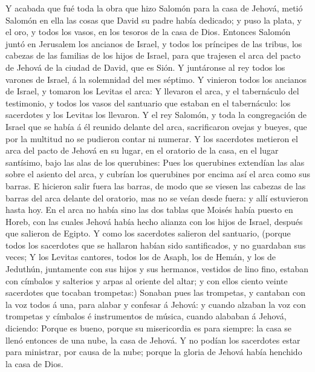  Y acabada que fué toda la obra que hizo Salomón para la
casa de Jehová, metió Salomón en ella las cosas que David su padre había
dedicado; y puso la plata, y el oro, y todos los vasos, en los tesoros
de la casa de Dios.  Entonces Salomón juntó en Jerusalem
los ancianos de Israel, y todos los príncipes de las tribus, los cabezas
de las familias de los hijos de Israel, para que trajesen el arca del
pacto de Jehová de la ciudad de David, que es Sión.  Y
juntáronse al rey todos los varones de Israel, á la solemnidad del mes
séptimo.  Y vinieron todos los ancianos de Israel, y
tomaron los Levitas el arca:  Y llevaron el arca, y el
tabernáculo del testimonio, y todos los vasos del santuario que estaban
en el tabernáculo: los sacerdotes y los Levitas los llevaron.
 Y el rey Salomón, y toda la congregación de Israel que se
había á él reunido delante del arca, sacrificaron ovejas y bueyes, que
por la multitud no se pudieron contar ni numerar.  Y los
sacerdotes metieron el arca del pacto de Jehová en su lugar, en el
oratorio de la casa, en el lugar santísimo, bajo las alas de los
querubines:  Pues los querubines extendían las alas sobre
el asiento del arca, y cubrían los querubines por encima así el arca
como sus barras.  E hicieron salir fuera las barras, de
modo que se viesen las cabezas de las barras del arca delante del
oratorio, mas no se veían desde fuera: y allí estuvieron hasta hoy.
 En el arca no había sino las dos tablas que Moisés había
puesto en Horeb, con las cuales Jehová había hecho alianza con los hijos
de Israel, después que salieron de Egipto.  Y como los
sacerdotes salieron del santuario, (porque todos los sacerdotes que se
hallaron habían sido santificados, y no guardaban sus veces;
 Y los Levitas cantores, todos los de Asaph, los de
Hemán, y los de Jeduthún, juntamente con sus hijos y sus hermanos,
vestidos de lino fino, estaban con címbalos y salterios y arpas al
oriente del altar; y con ellos ciento veinte sacerdotes que tocaban
trompetas:)  Sonaban pues las trompetas, y cantaban con
la voz todos á una, para alabar y confesar á Jehová: y cuando alzaban la
voz con trompetas y címbalos é instrumentos de música, cuando alababan á
Jehová, diciendo: Porque es bueno, porque su misericordia es para
siempre: la casa se llenó entonces de una nube, la casa de Jehová.
 Y no podían los sacerdotes estar para ministrar, por
causa de la nube; porque la gloria de Jehová había henchido la casa de
Dios.

